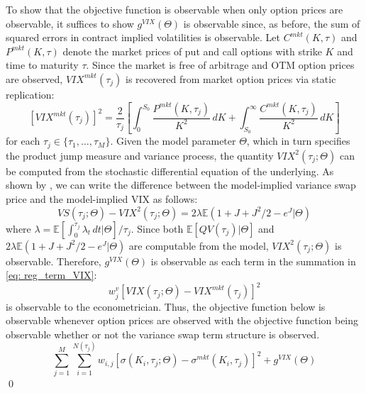 \documentclass[12pt]{article}
\begin{document}
To show that the objective function is observable when only option prices are observable, it suffices to show $g^{VIX}(\Theta)$ is observable since, as before, the sum of squared errors in contract implied volatilities is observable. Let $C^{mkt}(K, \tau)$ and $P^{mkt}(K, \tau)$ denote the market prices of put and call options with strike $K$ and time to maturity $\tau$. Since the market is free of arbitrage and OTM option prices are observed, $VIX^{mkt}(\tau_j)$ is recovered from market option prices via static replication:
$$  \left[VIX^{mkt}(\tau_j)\right]^2   = \dfrac{2}{\tau_j}\left[\int_0^{S_0} \dfrac{P^{mkt}(K, \tau_j)}{K^2} \, dK +  \int_{S_0}^\infty \dfrac{C^{mkt}(K, \tau_j)}{K^2}  \, dK \right]$$
for each $\tau_j \in \lbrace \tau_1, \ldots, \tau_M\rbrace$. Given the model parameter $\Theta$, which in turn specifies the product jump measure and variance process, the quantity $VIX^2(\tau_j; \Theta)$ can be computed from the stochastic differential equation of the underlying. As shown by \cite{ait2020term}, we can write the difference between the model-implied variance swap price and the model-implied VIX as follows:
$$VS(\tau_j; \Theta) - VIX^2(\tau_j; \Theta) = 2\lambda \mathbb{E}(1+J+J^2/2 - e^J\vert \Theta) $$
where $\lambda = \mathbb{E}\left[\int_0^{\tau_j} \lambda_t \, dt \vert \Theta\right]/\tau_j$. Since both $\mathbb{E}\left[QV(\tau_j) \vert \Theta\right]$ and $2\lambda \mathbb{E}(1+J+J^2/2 - e^J\vert \Theta)$ are computable from the model, $ VIX^2(\tau_j; \Theta)$ is observable. Therefore, $g^{VIX}(\Theta)$ is observable as each term in the summation in \eqref{eq: reg_term_VIX}:
$$w^v_j \left[VIX(\tau_j; \Theta) - VIX^{mkt}(\tau_j)\right]^2$$
is observable to the econometrician. Thus, the objective function below is observable whenever option prices are observed with the objective function being observable whether or not the variance swap term structure is observed.
$$\sum\limits_{j=1}^{M}\sum\limits_{i=1}^{N(\tau_j)} w_{i,j}\left[\sigma(K_i, \tau_j; \Theta) - \sigma^{mkt}(K_i, \tau_j)\right]^2 +  g^{VIX}(\Theta) $$ 
\qed 
\end{document}
